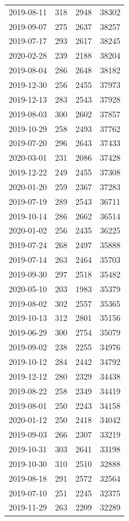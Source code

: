 \begin{tabular}{lrrr}
2019-08-11 & 318 & 2948 & 38302 \\
2019-09-07 & 275 & 2637 & 38257 \\
2019-07-17 & 293 & 2617 & 38245 \\
2020-02-28 & 239 & 2188 & 38204 \\
2019-08-04 & 286 & 2648 & 38182 \\
2019-12-30 & 256 & 2455 & 37973 \\
2019-12-13 & 283 & 2543 & 37928 \\
2019-08-03 & 300 & 2602 & 37857 \\
2019-10-29 & 258 & 2493 & 37762 \\
2019-07-20 & 296 & 2643 & 37433 \\
2020-03-01 & 231 & 2086 & 37428 \\
2019-12-22 & 249 & 2455 & 37308 \\
2020-01-20 & 259 & 2367 & 37283 \\
2019-07-19 & 289 & 2543 & 36711 \\
2019-10-14 & 286 & 2662 & 36514 \\
2020-01-02 & 256 & 2435 & 36225 \\
2019-07-24 & 268 & 2497 & 35888 \\
2019-07-14 & 263 & 2464 & 35703 \\
2019-09-30 & 297 & 2518 & 35482 \\
2020-05-10 & 203 & 1983 & 35379 \\
2019-08-02 & 302 & 2557 & 35365 \\
2019-10-13 & 312 & 2801 & 35156 \\
2019-06-29 & 300 & 2754 & 35079 \\
2019-09-02 & 238 & 2255 & 34976 \\
2019-10-12 & 284 & 2442 & 34792 \\
2019-12-12 & 280 & 2329 & 34438 \\
2019-08-22 & 258 & 2349 & 34419 \\
2019-08-01 & 250 & 2243 & 34158 \\
2020-01-12 & 250 & 2418 & 34042 \\
2019-09-03 & 266 & 2307 & 33219 \\
2019-10-31 & 303 & 2641 & 33198 \\
2019-10-30 & 310 & 2510 & 32888 \\
2019-08-18 & 291 & 2572 & 32564 \\
2019-07-10 & 251 & 2245 & 32375 \\
2019-11-29 & 263 & 2209 & 32289 \\

\end{tabular}
